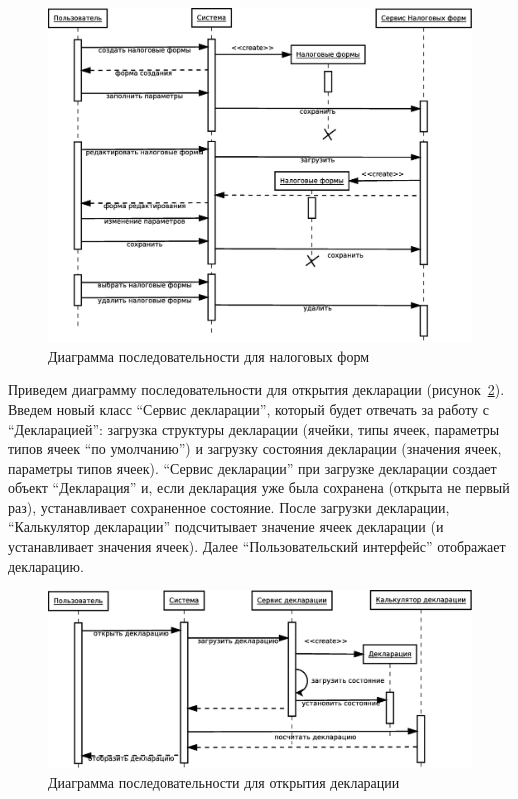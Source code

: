 \documentclass[14pt,a4paper]{reportmod}
\begin{document}
\begin{figure}
  \centering
  \includegraphics[scale=0.4]{uml/_sequence_6}
  \caption{Диаграмма последовательности для налоговых форм}
  \label{pic:sequence_3}
\end{figure}

Приведем диаграмму последовательности для открытия декларации (рисунок~\ref{pic:sequence_4}). Введем новый класс ``Сервис декларации'', который будет отвечать за работу с ``Декларацией'': загрузка структуры декларации (ячейки, типы ячеек, параметры типов ячеек ``по умолчанию'') и загрузку состояния декларации (значения ячеек, параметры типов ячеек). ``Сервис декларации'' при загрузке декларации создает объект ``Декларация'' и, если декларация уже была сохранена (открыта не первый раз), устанавливает сохраненное состояние. После загрузки декларации, ``Калькулятор декларации'' подсчитывает значение ячеек декларации (и устанавливает значения ячеек). Далее ``Пользовательский интерфейс'' отображает декларацию.

\begin{figure}
  \centering
  \includegraphics[scale=0.4]{uml/_sequence_1}
  \caption{Диаграмма последовательности для открытия декларации}
  \label{pic:sequence_4}
\end{figure}
\end{document}
